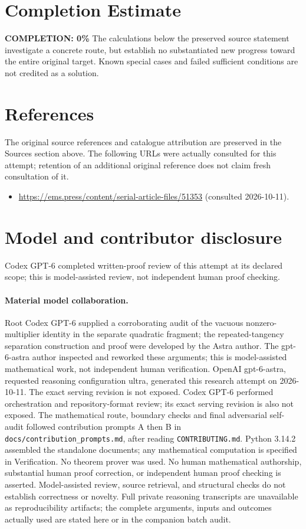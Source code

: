 \documentclass[11pt]{article}
\begin{document}
\section{Completion Estimate}
\noindent\textbf{COMPLETION: 0\%}
The calculations below the preserved source statement investigate a concrete route,
but establish no substantiated new progress toward the entire original target.
Known special cases and failed sufficient conditions are not credited as a solution.
\section{References}
The original source references and catalogue attribution are preserved in the
Sources section above. The following URLs were actually consulted for this attempt;
retention of an additional original reference does not claim fresh consultation of it.
\begin{itemize}
\item \url{https://ems.press/content/serial-article-files/51353} (consulted 2026-10-11). 
\end{itemize}
\section{Model and contributor disclosure}
Codex GPT-6 completed written-proof review of this attempt at its declared scope; this is model-assisted review, not independent human proof checking.
\paragraph{Material model collaboration.} Root Codex GPT-6 supplied a corroborating audit of the vacuous nonzero-multiplier identity in the separate quadratic fragment; the repeated-tangency separation construction and proof were developed by the Astra author. The gpt-6-astra author inspected and reworked these arguments; this is model-assisted mathematical work, not independent human verification.
OpenAI gpt-6-astra, requested reasoning configuration ultra, generated this research
attempt on 2026-10-11. The exact serving revision is not exposed. Codex GPT-6
performed orchestration and repository-format review; its exact serving revision
is also not exposed. The mathematical route, boundary checks and final adversarial
self-audit followed contribution prompts A then B in
\texttt{docs/contribution\_prompts.md}, after reading \texttt{CONTRIBUTING.md}.
Python 3.14.2 assembled the standalone documents; any mathematical computation is
specified in Verification. No theorem prover was used. No human mathematical
authorship, substantial human proof correction, or independent human proof checking
is asserted. Model-assisted review, source retrieval, and structural checks do not
establish correctness or novelty. Full private reasoning transcripts are unavailable
as reproducibility artifacts; the complete arguments, inputs and outcomes actually
used are stated here or in the companion batch audit.
\end{document}
